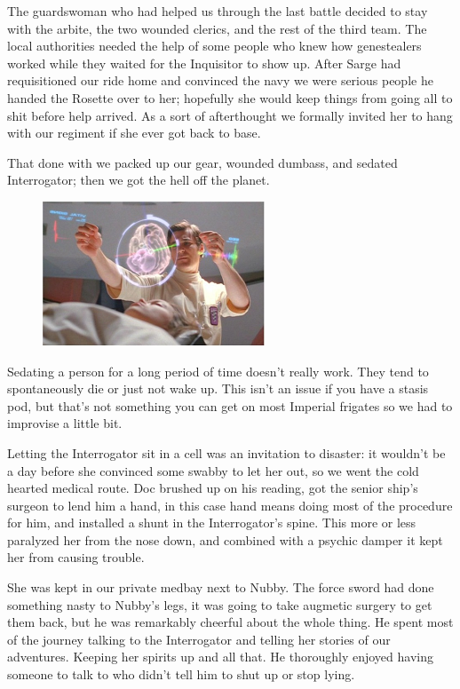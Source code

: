 The guardswoman who had helped us through the last battle decided to stay with the arbite, the two wounded clerics, and the rest of the third team. 
The local authorities needed the help of some people who knew how genestealers worked while they waited for the Inquisitor to show up. 
After Sarge had requisitioned our ride home and convinced the navy we were serious people he handed the Rosette over to her; 
hopefully she would keep things from going all to shit before help arrived. 
As a sort of afterthought we formally invited her to hang with our regiment if she ever got back to base.

That done with we packed up our gear, wounded dumbass, and sedated Interrogator; 
then we got the hell off the planet.

\begin{figure}
	\begin{center}
		\includegraphics[width=\figwidth]{pics/5/41.png}
	\end{center}
\end{figure}
Sedating a person for a long period of time doesn’t really work. They tend to spontaneously die or just not wake up. 
This isn’t an issue if you have a stasis pod, but that’s not something you can get on most Imperial frigates so we had to improvise a little bit.

Letting the Interrogator sit in a cell was an invitation to disaster: 
it wouldn’t be a day before she convinced some swabby to let her out, so we went the cold hearted medical route. 
Doc brushed up on his reading, got the senior ship’s surgeon to lend him a hand, in this case hand means doing most of the procedure for him, and installed a shunt in the Interrogator’s spine. 
This more or less paralyzed her from the nose down, and combined with a psychic damper it kept her from causing trouble.

She was kept in our private medbay next to Nubby. 
The force sword had done something nasty to Nubby’s legs, it was going to take augmetic surgery to get them back, but he was remarkably cheerful about the whole thing. 
He spent most of the journey talking to the Interrogator and telling her stories of our adventures. Keeping her spirits up and all that. 
He thoroughly enjoyed having someone to talk to who didn’t tell him to shut up or stop lying.

